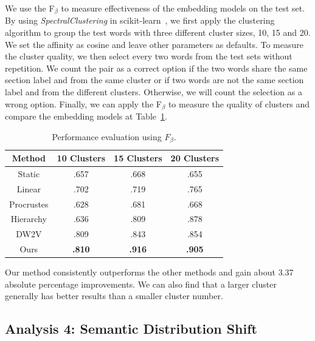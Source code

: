 We use the F$_\beta$ to measure effectiveness of the embedding models on the test set.
By using \textit{SpectralClustering} in scikit-learn~\cite{pedregosa2011scikit}, we first apply the clustering algorithm to group the test words with three different cluster sizes, 10, 15 and 20. 
We set the affinity as cosine and leave other parameters as defaults.
To measure the cluster quality, we then select every two words from the test sets without repetition.
We count the pair as a correct option if the two words share the same section label and from the same cluster or if two words are not the same section label and from the different clusters.
Otherwise, we will count the selection as a wrong option.
Finally, we can apply the F$_\beta$ to measure the quality of clusters and compare the embedding models at Table~\ref{chap3:tab:dweEval}.

\begin{table}[htp]
\centering
\begin{tabular}{c||ccc}
Method & 10 Clusters & 15 Clusters & 20 Clusters \\\hline\hline
Static & .657 & .668 & .655 \\
Linear & .702 & .719 & .765 \\
Procrustes & .628 & .681 & .668 \\
Hierarchy & .636 & .809 & .878 \\
DW2V & .809 & .843 & .854 \\
Ours & \textbf{.810} & \textbf{.916} & \textbf{.905}
\end{tabular}
\caption{Performance evaluation using $F_\beta$.}
\label{chap3:tab:dweEval}
\end{table}

Our method consistently outperforms the other methods and gain about 3.37 absolute percentage improvements. We can also find that a larger cluster generally has better results than a smaller cluster number.


\subsection{Analysis 4: Semantic Distribution Shift}

